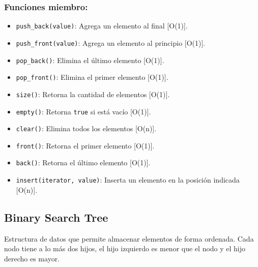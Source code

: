 \subsubsection{Funciones miembro:}
\begin{itemize}
  \item \texttt{push\_back(value)}: Agrega un elemento al final [O(1)].
  \item \texttt{push\_front(value)}: Agrega un elemento al principio [O(1)].
  \item \texttt{pop\_back()}: Elimina el último elemento [O(1)].
  \item \texttt{pop\_front()}: Elimina el primer elemento [O(1)].
  \item \texttt{size()}: Retorna la cantidad de elementos [O(1)].
  \item \texttt{empty()}: Retorna \texttt{true} si está vacío [O(1)].
  \item \texttt{clear()}: Elimina todos los elementos [O(n)].
  \item \texttt{front()}: Retorna el primer elemento [O(1)].
  \item \texttt{back()}: Retorna el último elemento [O(1)].
  \item \texttt{insert(iterator, value)}: Inserta un elemento en la posición indicada [O(n)]. 
\end{itemize}


\subsection{Binary Search Tree}
\label{subsec:binary_search_tree}
Estructura de datos que permite almacenar elementos de forma ordenada. Cada nodo tiene a lo más dos hijos, el hijo izquierdo es menor que el nodo y el hijo derecho es mayor. 

